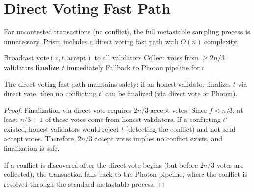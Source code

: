 \section{Direct Voting Fast Path}

\label{sec:prism-voting}

For uncontested transactions (no conflict), the full metastable sampling process is
unnecessary. Prism includes a direct voting fast path with $O(n)$ complexity.

\begin{algorithm}[H]
\caption{Prism Direct Voting --- Uncontested Fast Path}
\label{alg:prism-voting}
\begin{algorithmic}[1]
     
        \State Broadcast $\text{vote}(v, t, \text{accept})$ to all validators
        \State Collect votes from $\geq 2n/3$ validators
            \State \textbf{finalize} $t$ immediately 
        \Else
            \State Fallback to Photon pipeline for $t$ 
        \EndIf
    \EndIf
\EndFunction
\end{algorithmic}
\end{algorithm}

\begin{proposition}
\label{prop:fast-path}
The direct voting fast path maintains safety: if an honest validator finalizes $t$
via direct vote, then no conflicting $t'$ can be finalized (via direct vote or Photon).
\end{proposition}

\begin{proof}
Finalization via direct vote requires $2n/3$ accept votes. Since $f < n/3$, at least
$n/3 + 1$ of these votes come from honest validators. If a conflicting $t'$ existed,
honest validators would reject $t$ (detecting the conflict) and not send accept votes.
Therefore, $2n/3$ accept votes implies no conflict exists, and finalization is safe.

If a conflict is discovered after the direct vote begins (but before $2n/3$ votes are
collected), the transaction falls back to the Photon pipeline, where the conflict is
resolved through the standard metastable process.
\end{proof}

